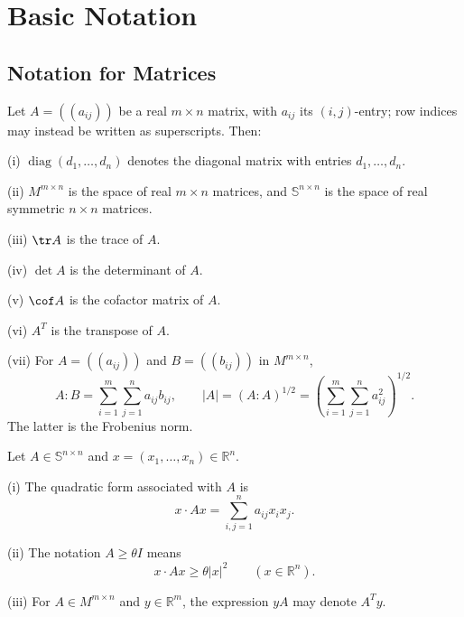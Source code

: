 
\section{Basic Notation}
\label{sec:basic-notation}

\subsection{Notation for Matrices}
\label{sec:notation-for-matrices}

\begin{definition}
\label{def:matrix-notation-basic}
Let $A=((a_{ij}))$ be a real $m\times n$ matrix, with $a_{ij}$ its $(i,j)$-entry; row indices may instead be written as superscripts. Then:

(i) $\operatorname{diag}(d_1,\ldots,d_n)$ denotes the diagonal matrix with entries $d_1,\ldots,d_n$.

(ii) $M^{m\times n}$ is the space of real $m\times n$ matrices, and $\mathbb{S}^{n\times n}$ is the space of real symmetric $n\times n$ matrices.

(iii) $\tr A$ is the trace of $A$.

(iv) $\det A$ is the determinant of $A$.

(v) $\cof A$ is the cofactor matrix of $A$.

(vi) $A^T$ is the transpose of $A$.

(vii) For $A=((a_{ij}))$ and $B=((b_{ij}))$ in $M^{m\times n}$,
\[
A:B=\sum_{i=1}^m\sum_{j=1}^n a_{ij}b_{ij},
\qquad
|A|=(A:A)^{1/2}
=\left(\sum_{i=1}^m\sum_{j=1}^n a_{ij}^2\right)^{1/2}.
\]
The latter is the Frobenius norm.
\end{definition}

\begin{definition}
\label{def:matrix-quadratic-form-notation}
Let $A\in\mathbb{S}^{n\times n}$ and $x=(x_1,\ldots,x_n)\in\mathbb R^n$.

(i) The quadratic form associated with $A$ is
\[
x\cdot Ax=\sum_{i,j=1}^n a_{ij}x_ix_j.
\]

(ii) The notation $A\geq\theta I$ means
\[
x\cdot Ax\geq\theta|x|^2\qquad(x\in\mathbb R^n).
\]

(iii) For $A\in M^{m\times n}$ and $y\in\mathbb R^m$, the expression $yA$ may denote $A^Ty$.
\end{definition}

